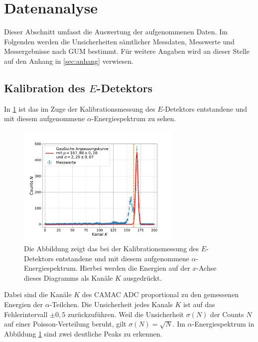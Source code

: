 \section{Datenanalyse}

Dieser Abschnitt umfasst die Auswertung der aufgenommenen Daten.
Im Folgenden werden die Unsicherheiten sämtlicher Messdaten, Messwerte und Messergebnisse nach GUM\cite{1} bestimmt.
Für weitere Angaben wird an dieser Stelle auf den Anhang in \cref{sec:anhang} verwiesen.

\subsection{Kalibration des $E$-Detektors} \label{KaliEDet}

In \cref{EDetectorCalibrationChannelSpectrumEDetector} ist das im Zuge der Kalibrationsmessung des $E$-Detektors entstandene und mit diesem aufgenommene $\alpha$-Energiespektrum zu sehen.
\begin{figure}[ht]
	\centering
	\includegraphics[width=0.7\textwidth]{src/EDetectorCalibrationChannelSpectrumEDetector}
	\caption{Die Abbildung zeigt das bei der Kalibrationsmessung des $E$-Detektors entstandene und mit diesem aufgenommene $\alpha$-Energiespektrum. Hierbei werden die Energien auf der $x$-Achse dieses Diagramms als Kanäle $K$ ausgedrückt.}
	\label{EDetectorCalibrationChannelSpectrumEDetector}
\end{figure}
Dabei sind die Kanäle $K$ des CAMAC ADC proportional zu den gemessenen Energien der $\alpha$-Teilchen.
Die Unsicherheit jedes Kanals $K$ ist auf das Fehlerintervall $\pm 0,5$ zurückzuführen.
Weil die Unsicherheit $\sigma(N)$ der Counts $N$ auf einer Poisson-Verteilung beruht, gilt $\sigma(N)=\sqrt{N}$.
Im $\alpha$-Energiespektrum in Abbildung \ref{EDetectorCalibrationChannelSpectrumEDetector} sind zwei deutliche Peaks zu erkennen.

